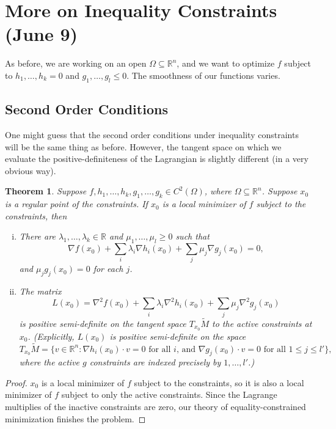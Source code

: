 \documentclass[11pt]{article}
\newcommand{\R}{\mathbb{R}}
\newtheorem{theorem}{Theorem}[subsection]
\begin{document}
\newpage

\section{More on Inequality Constraints (June 9)}

As before, we are working on an open $\Omega \subseteq \R^n$, and we want to optimize $f$ subject to $h_1, \dots, h_k = 0$ and $g_1, \dots, g_l \leq 0$. The smoothness of our functions varies.

\subsection{Second Order Conditions}

One might guess that the second order conditions under inequality constraints will be the same thing as before. However, the tangent space on which we evaluate the positive-definiteness of the Lagrangian is slightly different (in a very obvious way).

\begin{theorem}
Suppose $f, h_1, \dots, h_k, g_1, \dots, g_k \in C^2(\Omega)$, where $\Omega \subseteq \R^n$. Suppose $x_0$ is a regular point of the constraints. If $x_0$ is a local minimizer of $f$ subject to the constraints, then
\begin{enumerate}[(i)]
\item
There are $\lambda_1, \dots, \lambda_k \in \R$ and $\mu_1, \dots, \mu_l \geq 0$ such that
\[
\nabla f(x_0) + \sum_i \lambda_i \nabla h_i(x_0) + \sum_j \mu_j \nabla g_j(x_0) = 0,
\]
and $\mu_j g_j(x_0) = 0$ for each $j$.

\item
The matrix
\[
L(x_0) = \nabla^2 f(x_0) + \sum_i \lambda_i \nabla^2 h_i(x_0) + \sum_j \mu_j \nabla^2 g_j(x_0)
\]
is positive semi-definite on the tangent space $T_{x_0}\tilde{M}$ to the active constraints at $x_0$. (Explicitly, $L(x_0)$ is positive semi-definite on the space
\[
T_{x_0}\tilde{M} = \{v \in \R^n : \nabla h_i(x_0) \cdot v = 0 \text{ for all $i$, and } \nabla g_j(x_0) \cdot v = 0 \text{ for all $1 \leq j \leq l'$}\},
\]
where the active $g$ constraints are indexed precisely by $1, \dots, l'$.)
\end{enumerate}
\end{theorem}
\begin{proof}
$x_0$ is a local minimizer of $f$ subject to the constraints, so it is also a local minimizer of $f$ subject to only the active constraints. Since the Lagrange multiplies of the inactive constraints are zero, our theory of equality-constrained minimization finishes the problem.
\end{proof}
\end{document}
